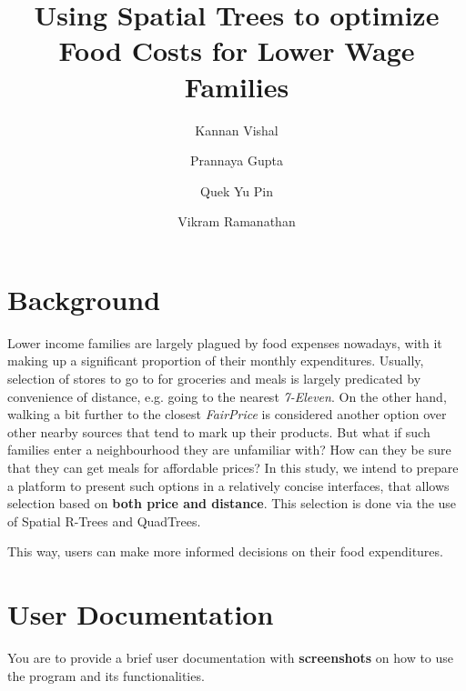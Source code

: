 \documentclass[12pt]{article}
\begin{document}
\pagestyle{fancy}
\fancyhf{}



{\selectfont
\title{
	\huge \textbf{Using Spatial Trees to optimize Food Costs for Lower Wage Families}
}

\date{}

\author[1]{Kannan Vishal}
\author[1]{Prannaya Gupta}
\author[1]{Quek Yu Pin}
\author[1]{Vikram Ramanathan}

\maketitle

\vspace{-2cm}

\tableofcontents

\thispagestyle{empty}
\newpage

\section{Background}

Lower income families are largely plagued by food expenses nowadays, with it making up a significant proportion of their monthly expenditures. Usually, selection of stores to go to for groceries and meals is largely predicated by convenience of distance, e.g. going to the nearest \textit{7-Eleven}. On the other hand, walking a bit further to the closest \textit{FairPrice} is considered another option over other nearby sources that tend to mark up their products. But what if such families enter a neighbourhood they are unfamiliar with? How can they be sure that they can get meals for affordable prices? In this study, we intend to prepare a platform to present such options in a relatively concise interfaces, that allows selection based on \textbf{both price and distance}. This selection is done via the use of Spatial R-Trees and QuadTrees.


This way, users can make more informed decisions on their food expenditures.
    
   
\section{User Documentation}
You are to provide a brief user documentation with \textbf{screenshots} on how to use the
program and its functionalities.

}
\end{document}

